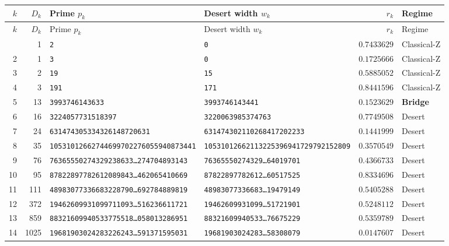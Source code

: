 \documentclass[11pt]{article}
\newcommand{\dt}{\ldots}
\begin{document}
\footnotesize
\begin{longtable}{@{}r r l l r l@{}}
\toprule
$k$ & $D_k$ & Prime $p_k$ & Desert width $w_k$ & $r_k$ & Regime \\
\midrule
\endfirsthead
\toprule
$k$ & $D_k$ & Prime $p_k$ & Desert width $w_k$ & $r_k$ & Regime \\
\midrule
\endhead
\bottomrule
\endfoot
1  & 1    & \texttt{2}                              & \texttt{0}                              & $0.7433629$ & Classical-Z \\
2  & 1    & \texttt{3}                              & \texttt{0}                              & $0.1725666$ & Classical-Z \\
3  & 2    & \texttt{19}                             & \texttt{15}                             & $0.5885052$ & Classical-Z \\
4  & 3    & \texttt{191}                            & \texttt{171}                            & $0.8441596$ & Classical-Z \\
5  & 13   & \texttt{3993746143633}                  & \texttt{3993746143441}                  & $0.1523629$ & \textbf{Bridge} \\
6  & 16   & \texttt{3224057731518397}              & \texttt{3220063985374763}              & $0.7749508$ & Desert \\
7  & 24   & \texttt{631474305334326148720631}      & \texttt{631474302110268417202233}      & $0.1441999$ & Desert \\
8  & 35   & \texttt{10531012662744699702276055940873441} & \texttt{10531012662113225396941729792152809} & $0.3570549$ & Desert \\
9  & 76   & \texttt{76365550274329238633\dt274704893143} & \texttt{76365550274329\dt64019701}      & $0.4366733$ & Desert \\
10 & 95   & \texttt{87822897782612089843\dt462065410669} & \texttt{87822897782612\dt60517525}      & $0.8334696$ & Desert \\
11 & 111  & \texttt{48983077336683228790\dt692784889819} & \texttt{48983077336683\dt19479149}      & $0.5405288$ & Desert \\
12 & 372  & \texttt{19462609931099711093\dt516236611721} & \texttt{19462609931099\dt51721901}      & $0.5248112$ & Desert \\
13 & 859  & \texttt{88321609940533775518\dt058013286951} & \texttt{88321609940533\dt76675229}      & $0.5359789$ & Desert \\
14 & 1025 & \texttt{19681903024283226243\dt591371595031} & \texttt{19681903024283\dt58308079}      & $0.0147607$ & Desert \\

\end{longtable}
\end{document}
